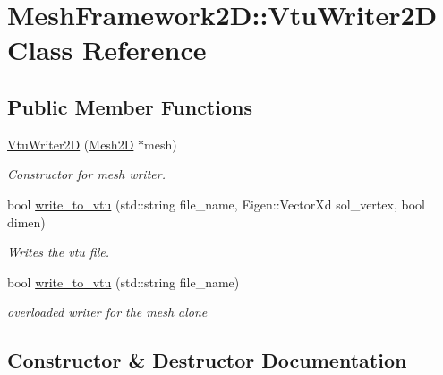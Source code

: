 \hypertarget{classMeshFramework2D_1_1VtuWriter2D}{}\section{Mesh\+Framework2D\+:\+:Vtu\+Writer2D Class Reference}
\label{classMeshFramework2D_1_1VtuWriter2D}
\subsection*{Public Member Functions}
\begin{DoxyCompactItemize}
\item 
\hyperlink{classMeshFramework2D_1_1VtuWriter2D_a30e274ce0dc037bff8720149b4c012f3}{Vtu\+Writer2D} (\hyperlink{classMeshFramework2D_1_1Mesh2D}{Mesh2D} $\ast$mesh)
\begin{DoxyCompactList}\small\item\em Constructor for mesh writer. \end{DoxyCompactList}\item 
bool \hyperlink{classMeshFramework2D_1_1VtuWriter2D_a3004c510461c2978278e781c8edec951}{write\+\_\+to\+\_\+vtu} (std\+::string file\+\_\+name, Eigen\+::\+Vector\+Xd sol\+\_\+vertex, bool dimen)
\begin{DoxyCompactList}\small\item\em Writes the vtu file. \end{DoxyCompactList}\item 
\mbox{\label{classMeshFramework2D_1_1VtuWriter2D_a5c3d3a2fc48b70a5ab1d3a4af207dc7e}} 
bool \hyperlink{classMeshFramework2D_1_1VtuWriter2D_a5c3d3a2fc48b70a5ab1d3a4af207dc7e}{write\+\_\+to\+\_\+vtu} (std\+::string file\+\_\+name)
\begin{DoxyCompactList}\small\item\em overloaded writer for the mesh alone \end{DoxyCompactList}\end{DoxyCompactItemize}


\subsection{Constructor \& Destructor Documentation}
\mbox{\label{classMeshFramework2D_1_1VtuWriter2D_a30e274ce0dc037bff8720149b4c012f3}} 
